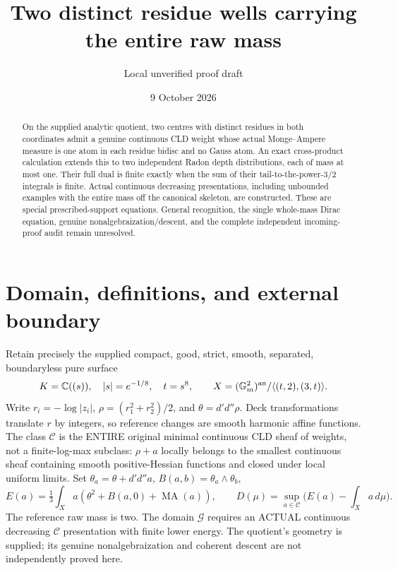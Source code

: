 \documentclass[11pt]{article}
\title{Two distinct residue wells carrying the entire raw mass}
\author{Local unverified proof draft}
\date{9 October 2026}
\newcommand{\DD}{d'd''}
\newcommand{\MA}{\operatorname{MA}}
\newcommand{\C}{\mathcal C}
\newcommand{\G}{\mathcal G}
\begin{document}
\maketitle
\begin{abstract}
On the supplied analytic quotient, two centres with distinct residues in
both coordinates admit a genuine continuous CLD weight whose actual
Monge--Ampere measure is one atom in each residue bidisc and no Gauss atom.
An exact cross-product calculation extends this to two independent Radon
depth distributions, each of mass at most one. Their full dual is finite
exactly when the sum of their tail-to-the-power-$3/2$ integrals is finite.
Actual continuous decreasing presentations, including unbounded examples
with the entire mass off the canonical skeleton, are constructed.
These are special prescribed-support equations. General recognition,
the single whole-mass Dirac equation, genuine nonalgebraization/descent,
and the complete independent incoming-proof audit remain unresolved.
\end{abstract}

\section*{Domain, definitions, and external boundary}
Retain precisely the supplied compact, good, strict, smooth, separated,
boundaryless pure surface
\[
 K=\mathbb C((s)),\quad |s|=e^{-1/8},\quad t=s^8,
 \qquad X=(\mathbb G_m^2)^{\rm an}/\langle(t,2),(3,t)\rangle.
\]
Write $r_i=-\log|z_i|$, $\rho=(r_1^2+r_2^2)/2$, and $\theta=\DD\rho$.
Deck transformations translate $r$ by integers, so reference changes are
smooth harmonic affine functions. The class $\C$ is the ENTIRE original
minimal continuous CLD sheaf of weights, not a finite-log-max subclass:
$\rho+a$ locally belongs to the smallest continuous sheaf containing
smooth positive-Hessian functions and closed under local uniform limits.
Set $\theta_a=\theta+\DD a$, $B(a,b)=\theta_a\wedge\theta_b$,
\[
 E(a)=\tfrac13\int_Xa(\theta^2+B(a,0)+\MA(a)),\qquad
 D(\mu)=\sup_{a\in\C}\bigl(E(a)-\int_Xa\,d\mu\bigr).
\]
The reference raw mass is two. The domain $\G$ requires an ACTUAL
continuous decreasing $\C$ presentation with finite lower energy.
The quotient's geometry is supplied; its genuine nonalgebraization and
coherent descent are not independently proved here.
\end{document}
